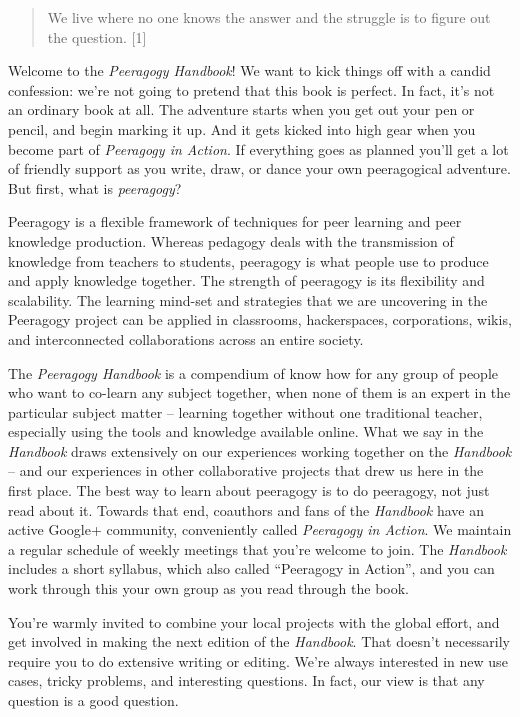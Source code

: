 \begin{quote}
We live where no one knows the answer and the struggle is to figure out
the question. {[}1{]}
\end{quote}

Welcome to the \emph{Peeragogy Handbook}! We want to kick things off
with a candid confession: we're not going to pretend that this book is
perfect. In fact, it's not an ordinary book at all. The adventure starts
when you get out your pen or pencil, and begin marking it up. And it
gets kicked into high gear when you become part of
\emph{Peeragogy in Action}.
If everything goes as planned you'll get a lot of friendly support as
you write, draw, or dance your own peeragogical adventure. But first,
what is \emph{peeragogy}?

Peeragogy is a flexible framework of techniques for peer learning and
peer knowledge production. Whereas pedagogy deals with the transmission
of knowledge from teachers to students, peeragogy is what people use to
produce and apply knowledge together. The strength of peeragogy is its
flexibility and scalability. The learning mind-set and strategies that
we are uncovering in the Peeragogy project can be applied in classrooms,
hackerspaces, corporations, wikis, and interconnected collaborations
across an entire society.

The \emph{Peeragogy Handbook} is a compendium of know how for any group
of people who want to co-learn any subject together, when none of them
is an expert in the particular subject matter -- learning together
without one traditional teacher, especially using the tools and
knowledge available online. What we say in the \emph{Handbook} draws
extensively on our experiences working together on the \emph{Handbook}
-- and our experiences in other collaborative projects that drew us here
in the first place. The best way to learn about peeragogy is to do
peeragogy, not just read about it.
Towards that end, coauthors and fans of the \emph{Handbook} have an active Google+ community,
conveniently called \emph{Peeragogy in Action}.
We maintain a regular schedule of weekly meetings that you're welcome to join.
The \emph{Handbook} includes a short syllabus, which also called
``Peeragogy in Action'', and you can work through this your own group
as you read through the book.

You're warmly invited to combine your local projects with the global
effort, and get involved in making the next edition of the
\emph{Handbook}.  That
doesn't necessarily require you to do extensive writing or editing.
We're always interested in new use cases, tricky problems, and
interesting questions. In fact, our view is that any question is a good
question.

